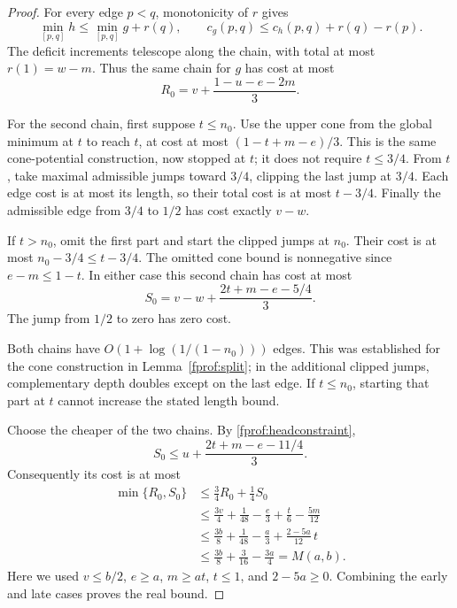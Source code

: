 \begin{proof}
For every edge \(p<q\), monotonicity of \(r\) gives
$$
 \min_{[p,q]}h\leq\min_{[p,q]}g+r(q),\qquad
 c_g(p,q)\leq c_h(p,q)+r(q)-r(p).
$$
The deficit increments telescope along the chain, with total at most
\(r(1)=w-m\). Thus the same chain for \(g\) has cost at most
\begin{equation}\label{fprof:reflectionR}
 R_0=v+\frac{1-u-e-2m}{3}.
\end{equation}

For the second chain, first suppose \(t\leq n_0\). Use the upper cone
from the global minimum at \(t\) to reach \(t\), at cost at most
\((1-t+m-e)/3\). This is the same cone-potential construction, now stopped
at \(t\); it does not require \(t\leq3/4\). From \(t\), take maximal
admissible jumps toward \(3/4\), clipping the last jump at \(3/4\).
Each edge cost is at most its length, so their total cost is at most
\(t-3/4\). Finally the admissible edge from \(3/4\) to \(1/2\)
has cost exactly \(v-w\).

If \(t>n_0\), omit the first part and start the clipped jumps at \(n_0\).
Their cost is at most \(n_0-3/4\leq t-3/4\). The omitted cone bound is
nonnegative since \(e-m\leq1-t\). In either case this second chain has
cost at most
\begin{equation}\label{fprof:reflectionS}
 S_0=v-w+\frac{2t+m-e-5/4}{3}.
\end{equation}
The jump from \(1/2\) to zero has zero cost.

Both chains have \(O(1+\log(1/(1-n_0)))\) edges. This was established for
the cone construction in Lemma~\ref{fprof:split}; in the additional clipped
jumps, complementary depth doubles except on the last edge. If \(t\leq n_0\),
starting that part at \(t\) cannot increase the stated length bound.

Choose the cheaper of the two chains. By \eqref{fprof:headconstraint},
$$
 S_0\leq u+\frac{2t+m-e-11/4}{3}.
$$
Consequently its cost is at most
\begin{align*}
 \min\{R_0,S_0\}
 &\leq\frac34 R_0+\frac14 S_0\\
 &\leq\frac{3v}{4}+\frac1{48}-\frac e3+\frac t6-\frac{5m}{12}\\
 &\leq\frac{3b}{8}+\frac1{48}-\frac a3+\frac{2-5a}{12}\,t\\
 &\leq\frac{3b}{8}+\frac3{16}-\frac{3a}{4}=M(a,b).
\end{align*}
Here we used \(v\leq b/2\), \(e\geq a\), \(m\geq at\), \(t\leq1\),
and \(2-5a\geq0\). Combining the early and late cases proves the real bound.


\end{proof}
